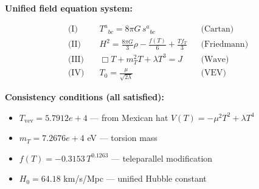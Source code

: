 
\textbf{Unified field equation system:}

\begin{align}
  \text{(I)} \quad & T^a{}_{bc} = 8\pi G \, s^a{}_{bc} && \text{(Cartan)} \\
  \text{(II)} \quad & H^2 = \frac{8\pi G}{3}\rho - \frac{f(T)}{6} + \frac{Tf_T}{3} && \text{(Friedmann)} \\
  \text{(III)} \quad & \Box T + m_T^2 T + \lambda T^3 = J && \text{(Wave)} \\
  \text{(IV)} \quad & T_0 = \frac{\mu}{\sqrt{2\lambda}} && \text{(VEV)}
\end{align}

\textbf{Consistency conditions (all satisfied):}
\begin{itemize}
  \item $T_{\text{vev}} = 5.7912e+4$ — from Mexican hat $V(T) = -\mu^2 T^2 + \lambda T^4$
  \item $m_T = 7.2676e+4$ eV — torsion mass
  \item $f(T) = -0.3153 \, T^{0.1263}$ — teleparallel modification
  \item $H_0 = 64.18$ km/s/Mpc — unified Hubble constant
\end{itemize}